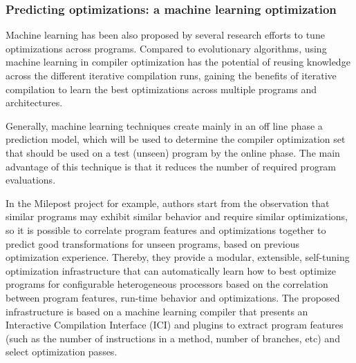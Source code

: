 

\subsubsection{Predicting optimizations: a machine learning optimization}
Machine learning has been also proposed by several research efforts to tune optimizations across programs. Compared to evolutionary algorithms, using machine learning in compiler optimization has the potential of reusing knowledge across the different iterative compilation runs, gaining the benefits of iterative compilation to learn the best optimizations across multiple programs and architectures.

Generally, machine learning techniques create mainly in an off line phase a prediction model, which will be used to determine the compiler optimization set that should be used on a test (unseen) program by the online phase. The main advantage of this technique is that it reduces the number of required program evaluations.

In the Milepost project\cite{fursin2011milepost} for example, authors start from the observation that similar programs may exhibit similar behavior and require similar optimizations, so it is possible to correlate program features and optimizations together to predict good transformations for unseen programs, based on previous optimization experience. Thereby, they provide a modular, extensible, self-tuning optimization infrastructure that can automatically learn how to best optimize programs for configurable heterogeneous processors based on the correlation between program features, run-time behavior and optimizations. 
The proposed infrastructure is based on a machine learning compiler that presents an Interactive Compilation Interface (ICI) and plugins to extract program features (such as the number of instructions in a method, number of branches, etc) and select optimization passes. 

